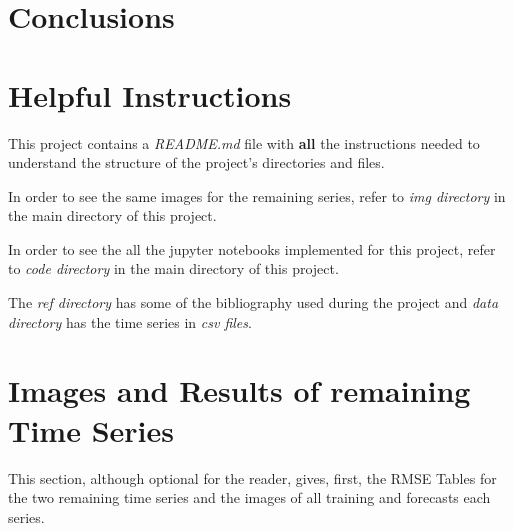\documentclass[10pt,twocolumn,letterpaper]{article}
\begin{document}
\section{Conclusions}



\appendix



\section{Helpful Instructions }

This project contains a \textit{README.md} file with \textbf{all} the instructions needed to understand the structure of the project's directories and files.

In order to see the same images for the remaining series, refer to \textit{img directory} in the main directory of this project.

In order to see the all the jupyter notebooks implemented for this project, refer to \textit{code directory} in the main directory of this project.

The \textit{ref directory} has some of the bibliography used during the project and \textit{data directory} has the time series in \textit{csv files}.

\section{Images and Results of remaining Time Series}

This section, although optional for the reader, gives, first, the RMSE Tables for the two remaining time series and the images of all training and forecasts each series. 
\end{document}
